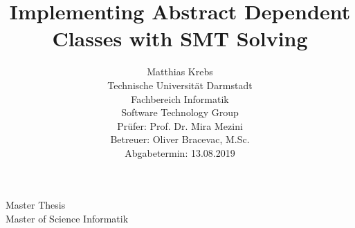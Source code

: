 \documentclass[a4paper, twoside]{report}
\begin{document}

\begin{center}
  Master Thesis\\
  Master of Science Informatik
\end{center}

\title{Implementing Abstract Dependent Classes with SMT Solving}
\author{
Matthias Krebs \\[6cm]
\small Technische Universität Darmstadt \\
\small Fachbereich Informatik \\
\small Software Technology Group \\[0.5cm]
\small Prüfer: Prof. Dr. Mira Mezini \\
\small Betreuer: Oliver Bracevac, M.Sc. \\[0.5cm]
\small Abgabetermin: 13.08.2019
}
\date{} %

\begingroup
\let\newpage\relax %
\maketitle
\endgroup
\end{document}
